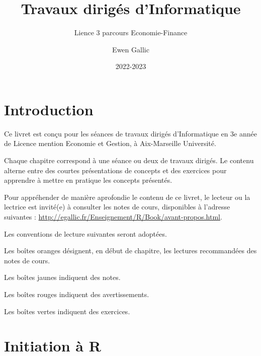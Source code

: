 \documentclass[
  11pt,
]{book}
\title{Travaux dirigés d'Informatique}
\subtitle{Lience 3 parcours Economie-Finance}
\author{Ewen Gallic}
\date{2022-2023}
\numberwithin{equation}{section}
\numberwithin{countremarque}{section}
\newcounter{exercices}[section]
\newenvironment{notebox}{
  \begin{tcolorbox}[breakable, colback=jaune,coltext=black,
                  colframe=grisfonce]}
 {\end{tcolorbox}}
\newenvironment{greenbox}{
  \begin{tcolorbox}[breakable, colback=vert,coltext=black,
                  colframe=grisfonce]}
 {\end{tcolorbox}}
\newenvironment{redbox}{
  \begin{tcolorbox}[breakable, colback=rouge,coltext=white,
                  colframe=grisfonce]}
 {\end{tcolorbox}}
\newenvironment{orangebox}{
  \begin{tcolorbox}[breakable, colback=oran,coltext=white,
                  colframe=grisfonce]}
 {\end{tcolorbox}}
\begin{document}
\maketitle

{
\hypersetup{linkcolor=}
\setcounter{tocdepth}{3}
\tableofcontents
}
\listoftables
\hypertarget{introduction}{%
\chapter*{Introduction}\label{introduction}}

Ce livret est conçu pour les séances de travaux dirigés d'Informatique en 3e année de Licence mention Economie et Gestion, à Aix-Marseille Université.

Chaque chapitre correspond à une séance ou deux de travaux dirigés. Le contenu alterne entre des courtes présentations de concepts et des exercices pour apprendre à mettre en pratique les concepts présentés.

Pour appréhender de manière aprofondie le contenu de ce livret, le lecteur ou la lectrice est invité(e) à consulter les notes de cours, disponibles à l'adresse suivantes : \url{http://egallic.fr/Enseignement/R/Book/avant-propos.html}.

Les conventions de lecture suivantes seront adoptées.

\begin{orangebox}
Les boîtes oranges désignent, en début de chapitre, les lectures recommandées des notes de cours.

\end{orangebox}

\begin{notebox}
Les boîtes jaunes indiquent des notes.

\end{notebox}

\begin{redbox}
Les boîtes rouges indiquent des avertissements.

\end{redbox}

\begin{greenbox}
Les boîtes vertes indiquent des exercices.

\end{greenbox}

\hypertarget{initiation-uxe0-r}{%
\chapter{Initiation à R}\label{initiation-uxe0-r}}
\end{document}
